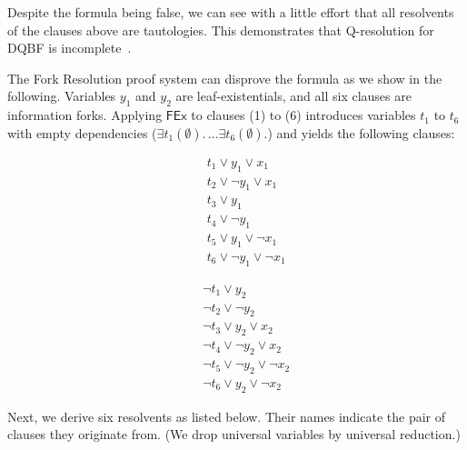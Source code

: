 \documentclass{svjour3}
\begin{document}
Despite the formula being false, we can see with a little effort that all resolvents of the clauses above are tautologies.
This demonstrates that Q-resolution for DQBF is incomplete~\cite{BalabanovChiangJiang/2014/ACertificationPerspectiveOfDQBF}. 

The Fork Resolution proof system can disprove the formula as we show in the following. 
Variables $y_1$ and $y_2$ are leaf-existentials, and all six clauses are information forks.
Applying $\mathsf{FEx}$ to clauses (1) to (6) introduces variables $t_1$ to $t_6$ with empty dependencies ($\exists t_1 (\emptyset).\,\dots\exists t_6(\emptyset).$) and yields the following clauses:

\vspace{-2mm}
\begin{minipage}{.33\textwidth}
\setcounter{equation}{0}
\renewcommand{\theequation}{\arabic{equation}a} 
\begin{eqnarray}
&& t_1 \vee y_1 \vee x_1 \\ %
&& t_2 \vee \neg y_1 \vee x_1 \\ %
&& t_3 \vee y_1 \\ %
&& t_4 \vee \neg y_1 \\ %
&& t_5 \vee y_1 \vee \neg x_1 \\ %
&& t_6 \vee \neg y_1 \vee \neg x_1 %
\end{eqnarray}
\end{minipage}
\qquad\qquad
\begin{minipage}{.4\textwidth}
\setcounter{equation}{0}
\renewcommand{\theequation}{\arabic{equation}b}
\begin{eqnarray}
&& \neg t_1 \vee y_2 \\ %
&& \neg t_2 \vee \neg y_2 \\ %
&& \neg t_3 \vee y_2 \vee x_2 \\ %
&& \neg t_4 \vee \neg y_2 \vee x_2 \\ %
&& \neg t_5 \vee \neg y_2 \vee \neg x_2 \\ %
&& \neg t_6 \vee y_2 \vee \neg x_2  %
\end{eqnarray}	
\end{minipage}

\vspace{2mm}
Next, we derive six resolvents as listed below.
Their names indicate the pair of clauses they originate from.
(We drop universal variables by universal reduction.)
\end{document}
